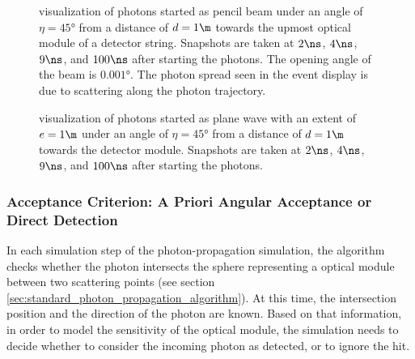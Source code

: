 \begin{figure}[htbp]
  \hfill
  \hfill
  \hfill
  \caption{\steamshovel visualization of photons started as pencil beam under an angle of $\eta = \ang{45}$ from a distance of $d = 1\m$ towards the upmost optical module of a detector string. Snapshots are taken at $2\ns$, $4\ns$, $9\ns$, and $100\ns$ after starting the photons. The opening angle of the beam is $\ang{0.001}$. The photon spread seen in the event display is due to scattering along the photon trajectory.}
  \label{fig:Paihah7h}
\end{figure}

\begin{figure}[htbp]
  \hfill
  \hfill
  \hfill
  \caption{\steamshovel visualization of photons started as plane wave with an extent of $e = 1\m$ under an angle of $\eta = \ang{45}$ from a distance of $d = 1\m$ towards the detector module. Snapshots are taken at $2\ns$, $4\ns$, $9\ns$, and $100\ns$ after starting the photons.}
  \label{fig:Aehi7kae}
\end{figure}


\FloatBarrier
\subsubsection{Acceptance Criterion: A Priori Angular Acceptance or Direct Detection}
\label{sec:acception_criterion}\label{sec:a_priori_angular_acceptance}
\label{sec:direct_detection}

In each simulation step of the photon-propagation simulation, the algorithm checks whether the photon intersects the sphere representing a optical module between two scattering points (see section \ref{sec:standard_photon_propagation_algorithm}). At this time, the intersection position and the direction of the photon are known. Based on that information, in order to model the sensitivity of the optical module, the simulation needs to decide whether to consider the incoming photon as detected, or to ignore the hit.

